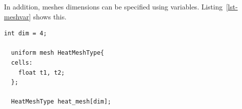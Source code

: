 In addition, meshes dimensions can be specified using variables.
Listing~\ref{lst-meshvar} shows this.

\par\bigskip
\begin{lstlisting}[float=h,label=lst-meshvar,
    caption={Mesh declarations using variable.}]
  int dim = 4;

  uniform mesh HeatMeshType{
  cells:
    float t1, t2;
  };

  HeatMeshType heat_mesh[dim];
\end{lstlisting}
\par\bigskip\noindent


